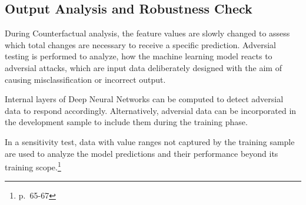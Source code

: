 \subsection{Output Analysis and Robustness Check}
During Counterfactual analysis, the feature values are slowly changed to assess which total changes are necessary to receive a specific prediction. Adversial testing is performed to analyze, how the machine learning model reacts to adversial attacks, which are input data deliberately designed with the aim of causing misclassification or incorrect output. 

Internal layers of Deep Neural Networks can be computed to detect adversial data to respond accordingly. Alternatively, adversial data can be incorporated in the development sample to include them during the training phase. 

In a sensitivity test, data with value ranges not captured by the training sample are used to analyze the model predictions and their performance beyond its training scope.\footnote{\cite{Roberts2022} p.~65-67}

